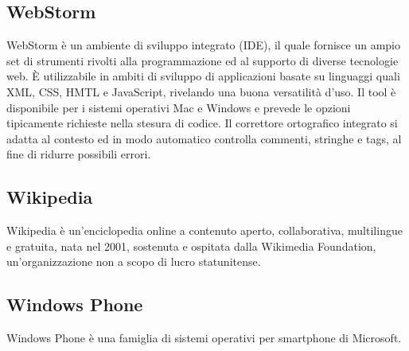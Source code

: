 \subsection{WebStorm}
WebStorm è un ambiente di sviluppo integrato (IDE), il quale fornisce un ampio set di strumenti rivolti alla programmazione ed al supporto di diverse tecnologie web. È utilizzabile in ambiti di sviluppo di applicazioni basate su linguaggi quali XML, CSS, HMTL e JavaScript, rivelando una buona versatilità d'uso. Il tool è disponibile per i sistemi operativi Mac e Windows e prevede le opzioni tipicamente richieste nella stesura di codice. Il correttore ortografico integrato si adatta al contesto ed in modo automatico controlla commenti, stringhe e tags, al fine di ridurre possibili errori.

\subsection{Wikipedia}
Wikipedia è un'enciclopedia online a contenuto aperto, collaborativa, multilingue e gratuita, nata nel 2001, sostenuta e ospitata dalla Wikimedia Foundation, un'organizzazione non a scopo di lucro statunitense.

\subsection{Windows Phone}
Windows Phone è una famiglia di sistemi operativi per smartphone di Microsoft.

